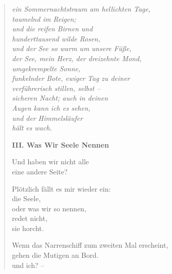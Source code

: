 \begin{verse}
{\itshape
ein Sommernachtstraum am hellichten Tage,\\
taumelnd im Reigen;\\
und die reifen Birnen und\\
hunderttausend wilde Rosen,\\
und der See so warm um unsere Füße,\\
der See, mein Herz, der dreizehnte Mond,\\
umgekrempelte Sonne,\\
funkelnder Bote, ewiger Tag zu deiner\\
verführerisch stillen, selbst --\\
sicheren Nacht; auch in deinen\\
Augen kann ich es sehen,\\
und der Himmelsläufer\\
hält es wach.}

\vspace*{-0.5em}
{\bfseries III. Was Wir Seele Nennen}
\vspace*{-0.5em}

Und haben wir nicht alle\\
eine andere Seite?

Plötzlich fällt es mir wieder ein:\\
die Seele,\\
oder was wir so nennen,\\
redet nicht,\\
sie horcht.

Wenn das Narrenschiff zum zweiten Mal erscheint,\\
gehen die Mutigen an Bord.\\
und ich? --
\end{verse}

\clearpage

